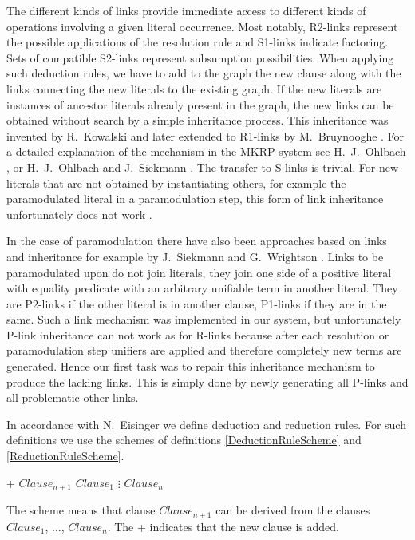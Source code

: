 The different kinds of links provide immediate access to different kinds of
operations involving a given literal occurrence. Most notably, R2-links
represent the possible applications of the resolution rule and S1-links
indicate factoring. Sets of compatible S2-links represent subsumption 
possibilities. When applying such deduction rules, we have to add to
the graph the new clause along with the links connecting the new literals
to the existing graph. If the new literals are instances of ancestor
literals already present in the graph, the new links can be obtained
without search by a simple inheritance process. This inheritance was
invented by R.\ Kowalski \cite{Kowalski75} and later extended to R1-links by M.\
Bruynooghe \cite{Bruynooghe75}. For a detailed explanation of the mechanism in the
MKRP-system see H.\ J.\ Ohlbach \cite{Ohlbach87}, or 
H.\ J.\ Ohlbach and J.\ Siekmann \cite{OhSi89}. 
The transfer to S-links is trivial. For new
literals that are not obtained by instantiating others, for example the
paramodulated literal in a paramodulation step, this form of link
inheritance unfortunately does not work \cite{Blaesius86}.

In the case of paramodulation there have also been approaches
based on links and inheritance for example by J.\ Siekmann 
and G.\ Wrightson \cite{SiWr80}. Links to be paramodulated
upon do not join literals, they join one side of a positive literal with
equality predicate with an arbitrary unifiable term in another literal.
They are P2-links if the other literal is in another clause, P1-links if
they are in the same. Such a link mechanism was implemented in our system,
but unfortunately P-link inheritance can not work as for R-links because
after each resolution or paramodulation step unifiers are applied and therefore
completely new terms are generated. Hence our first task was to repair this
inheritance mechanism to produce the lacking links. This is simply done by
newly generating all P-links and all problematic other links.

In accordance with N.\ Eisinger \cite{Eisinger89} we define deduction and
reduction rules. For such definitions we use the schemes of definitions
\ref{DeductionRuleScheme} and
\ref{ReductionRuleScheme}.


\begin{Def}
\return\vspace{-3mm}
\label{DeductionRuleScheme}

\hlineblockthree%
{+}%
{$Clause_{n+1}$}%
{$Clause_1$}%
{$\vdots$}%
{$Clause_n$}

The scheme means that clause $Clause_{n+1}$ can be derived from the clauses $Clause_1$,
$\ldots$, $Clause_n$. The + indicates that the new clause is added.
\end{Def}


